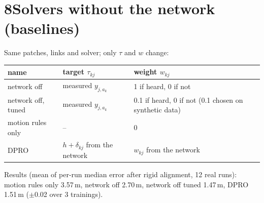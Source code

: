 \documentclass[11pt]{article}
\begin{document}
\section*{8\quad Solvers without the network (baselines)}
Same patches, links and solver; only $\tau$ and $w$ change:
\begin{center}\small
\begin{tabular}{@{}lll@{}}
\toprule
name & target $\tau_{kj}$ & weight $w_{kj}$ \\
\midrule
network off & measured $y_{j,a_k}$ & 1 if heard, 0 if not \\
network off, tuned & measured $y_{j,a_k}$ & 0.1 if heard, 0 if not (0.1 chosen on synthetic data) \\
motion rules only & -- & 0 \\
DPRO & $h+\delta_{kj}$ from the network & $w_{kj}$ from the network \\
\bottomrule
\end{tabular}
\end{center}
Results (mean of per-run median error after rigid alignment, 12 real runs): motion rules only 3.57\,m,
network off 2.70\,m, network off tuned 1.47\,m, DPRO 1.51\,m ($\pm$0.02 over 3 trainings).
\end{document}
